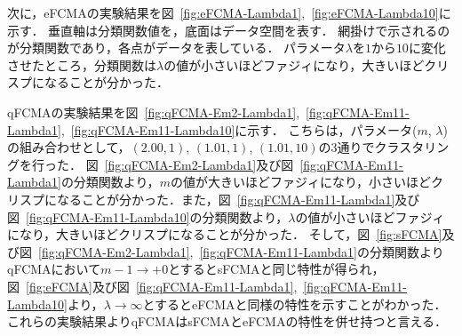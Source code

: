 \documentclass[twocolumn, a4paper]{icethesisabst}
\begin{document}
次に，eFCMAの実験結果を図~\ref{fig:eFCMA-Lambda1},~\ref{fig:eFCMA-Lambda10}に示す．
垂直軸は分類関数値を，底面はデータ空間を表す．
網掛けで示されるのが分類関数であり，各点がデータを表している．
パラメータ$\lambda$を$1$から$10$に変化させたところ，分類関数は$\lambda$の値が小さいほどファジィになり，大きいほどクリスプになることが分かった．

qFCMAの実験結果を図~\ref{fig:qFCMA-Em2-Lambda1},~\ref{fig:qFCMA-Em11-Lambda1},~\ref{fig:qFCMA-Em11-Lambda10}に示す．
こちらは，パラメータ($m$, $\lambda$)の組み合わせとして，$(2.00, 1)$, $(1.01, 1)$, $(1.01, 10)$の3通りでクラスタリングを行った．
図~\ref{fig:qFCMA-Em2-Lambda1}及び図~\ref{fig:qFCMA-Em11-Lambda1}の分類関数より，$m$の値が大きいほどファジィになり，小さいほどクリスプになることが分かった．また，図~\ref{fig:qFCMA-Em11-Lambda1}及び図~\ref{fig:qFCMA-Em11-Lambda10}の分類関数より，$\lambda$の値が小さいほどファジィになり，大きいほどクリスプになることが分かった．
そして，図~\ref{fig:sFCMA}及び図~\ref{fig:qFCMA-Em2-Lambda1},~\ref{fig:qFCMA-Em11-Lambda1}の分類関数よりqFCMAにおいて$m-1\rightarrow+0$とするとsFCMAと同じ特性が得られ，図~\ref{fig:eFCMA}及び図~\ref{fig:qFCMA-Em11-Lambda1},~\ref{fig:qFCMA-Em11-Lambda10}より，$\lambda\rightarrow\infty$とするとeFCMAと同様の特性を示すことがわかった．
これらの実験結果よりqFCMAはsFCMAとeFCMAの特性を併せ持つと言える．
\end{document}
